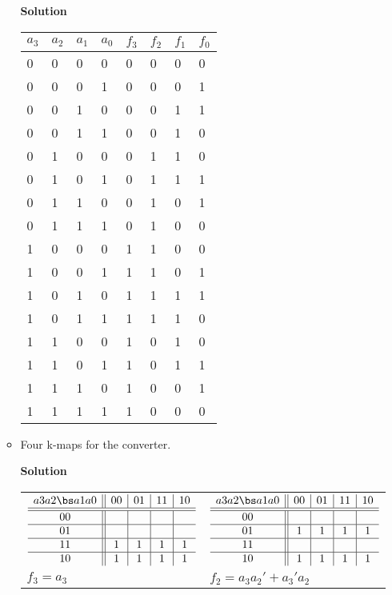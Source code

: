 \begin{enumerate}
\begin{itemize}
\begin{onlysolution}  \textbf{Solution} \itshape{
\begin{tabular}{l|l|l|l||l|l|l|l}
$a_3$ & $a_2$ & $a_1$ & $a_0$ & $f_3$ & $f_2$ & $f_1$ & $f_0$ \\ \hline
0&0&0&0 &0&0&0&0 \\ \hline
0&0&0&1 &0&0&0&1 \\ \hline
0&0&1&0 &0&0&1&1 \\ \hline
0&0&1&1 &0&0&1&0 \\ \hline
0&1&0&0 &0&1&1&0 \\ \hline
0&1&0&1 &0&1&1&1 \\ \hline
0&1&1&0 &0&1&0&1 \\ \hline
0&1&1&1 &0&1&0&0 \\ \hline
1&0&0&0 &1&1&0&0 \\ \hline
1&0&0&1 &1&1&0&1 \\ \hline
1&0&1&0 &1&1&1&1 \\ \hline
1&0&1&1 &1&1&1&0 \\ \hline
1&1&0&0 &1&0&1&0 \\ \hline
1&1&0&1 &1&0&1&1 \\ \hline
1&1&1&0 &1&0&0&1 \\ \hline
1&1&1&1 &1&0&0&0 \\ 
\end{tabular}
} \end{onlysolution} 

\item Four k-maps for the converter.

\begin{onlysolution}  \textbf{Solution} \itshape{
\begin{tabular}{ll}
$\begin{array} {c||c|c|c|c}
 a3 a2 \bs a1 a0 & 00 & 01 & 11 & 10 \\ \hline \hline
       00        &    &    &    &    \\ \hline
       01        &    &    &    &    \\ \hline
       11        & 1  & 1  & 1  & 1  \\ \hline
       10        & 1  & 1  & 1  & 1  \\
\end{array}$ &
$\begin{array} {c||c|c|c|c}
 a3 a2 \bs a1 a0 & 00 & 01 & 11 & 10 \\ \hline \hline
       00        &    &    &    &    \\ \hline
       01        & 1  & 1  & 1  & 1  \\ \hline
       11        &    &    &    &    \\ \hline
       10        & 1  & 1  & 1  & 1  \\
\end{array} $ \\
$f_3 = a_3$ & $f_2 = a_3a_2'+a_3'a_2$\\
\end{tabular}
} \end{onlysolution} 



\end{itemize}
\end{enumerate}
